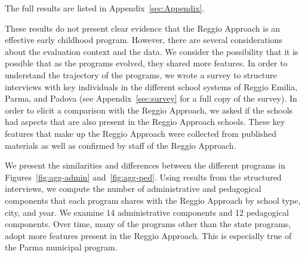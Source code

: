 
The full results are listed in Appendix~\ref{sec:Appendix}. %


These results do not present clear evidence that the Reggio Approach is an effective early childhood program. However, there are several considerations about the evaluation context and the data. We consider the possibility that it is possible that as the programs evolved, they shared more features. In order to understand the trajectory of the programs, we wrote a survey to structure interviews with key individuals in the different school systems of Reggio Emilia, Parma, and Padova (see Appendix~\ref{sec:survey} for a full copy of the survey). In order to elicit a comparison with the Reggio Approach, we asked if the schools had aspects that are also present in the Reggio Approach schools. These key features that make up the Reggio Approach were collected from published materials as well as confirmed by staff of the Reggio Approach. 

We present the similarities and differences between the different programs in Figures~\ref{fig:agg-admin} and~\ref{fig:agg-ped}. Using results from the structured interviews, we compute the number of administrative and pedagogical components that each program shares with the Reggio Approach by school type, city, and year. We examine 14 administrative components and 12 pedagogical components. Over time, many of the programs other than the state programs, adopt more features present in the Reggio Approach. This is especially true of the Parma municipal program.


